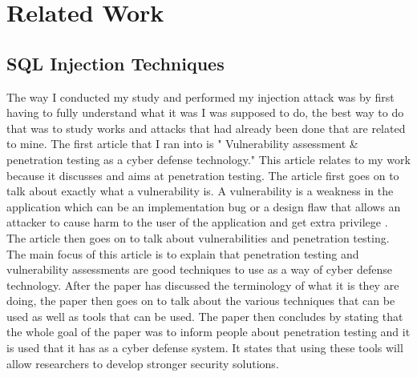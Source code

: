 
\chapter{Related Work}
\label{ch:relatedwork}

\section{SQL Injection Techniques}
\label{sec:sql injection techniques}
The way I conducted my study and performed my injection attack was by first having to fully understand what it was I was supposed to do, the best way to do that was to study works and attacks that had already been done that are related to mine. The first article that I ran into is "  Vulnerability assessment \& penetration testing as a cyber defense technology." This article relates to my work because it discusses and aims at penetration testing. The article first goes on to talk about exactly what a vulnerability is. A vulnerability is a weakness in the application which can be an implementation bug or a design flaw that allows an attacker to cause harm to the user of the application and get extra privilege \cite{goel2015vulnerability}.
The article then goes on to talk about vulnerabilities and penetration testing. The main focus of this article is to explain that penetration testing and vulnerability assessments are good techniques to use as a way of cyber defense technology. After the paper has discussed the terminology of what it is they are doing, the paper then goes on to talk about the various techniques that can be used as well as tools that can be used. The paper then concludes by stating that the whole goal of the paper was to inform people about penetration testing and it is used that it has as a cyber defense system. It states that using these tools will allow researchers to develop stronger security solutions.

